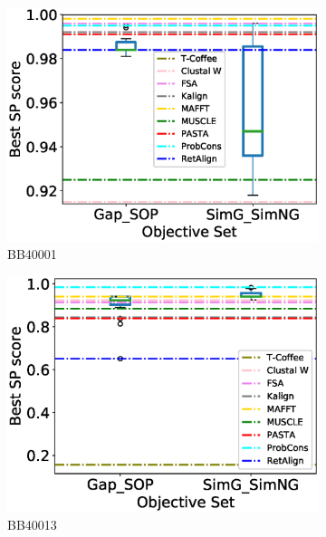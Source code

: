 \begin{figure}[!htbp]
\begin{adjustwidth}{-1.5cm}{-1cm}
		\begin{subfigure}{0.22\textwidth}
			\includegraphics[width=\columnwidth]{Figure/summary/precomputedInit/Balibase/BB40001_objset_pairs_rank_2}
			\caption{BB40001}
		\end{subfigure}	
		\begin{subfigure}{0.22\textwidth}
			\includegraphics[width=\columnwidth]{Figure/summary/precomputedInit/Balibase/BB40013_objset_pairs_rank_2}
			\caption{BB40013}
		\end{subfigure}
		\begin{subfigure}{0.22\textwidth}

\end{subfigure}
\end{adjustwidth}
\end{figure}
